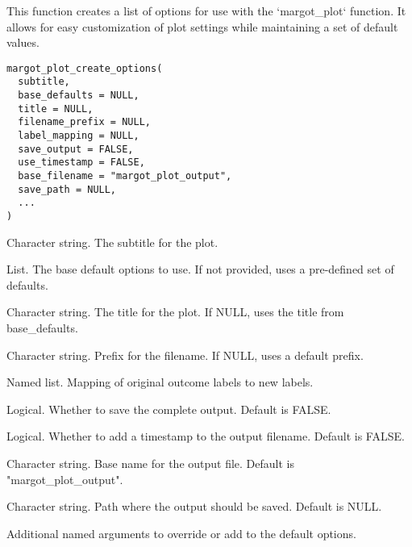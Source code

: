 \documentclass[a4paper]{book}
\begin{document}
%
\begin{Description}
This function creates a list of options for use with the `margot\_plot` function.
It allows for easy customization of plot settings while maintaining a set of default values.
\end{Description}
%
\begin{Usage}
\begin{verbatim}
margot_plot_create_options(
  subtitle,
  base_defaults = NULL,
  title = NULL,
  filename_prefix = NULL,
  label_mapping = NULL,
  save_output = FALSE,
  use_timestamp = FALSE,
  base_filename = "margot_plot_output",
  save_path = NULL,
  ...
)
\end{verbatim}
\end{Usage}
%
\begin{Arguments}
\begin{ldescription}
\item[\code{subtitle}] Character string. The subtitle for the plot.

\item[\code{base\_defaults}] List. The base default options to use. If not provided, uses a pre-defined set of defaults.

\item[\code{title}] Character string. The title for the plot. If NULL, uses the title from base\_defaults.

\item[\code{filename\_prefix}] Character string. Prefix for the filename. If NULL, uses a default prefix.

\item[\code{label\_mapping}] Named list. Mapping of original outcome labels to new labels.

\item[\code{save\_output}] Logical. Whether to save the complete output. Default is FALSE.

\item[\code{use\_timestamp}] Logical. Whether to add a timestamp to the output filename. Default is FALSE.

\item[\code{base\_filename}] Character string. Base name for the output file. Default is "margot\_plot\_output".

\item[\code{save\_path}] Character string. Path where the output should be saved. Default is NULL.

\item[\code{...}] Additional named arguments to override or add to the default options.
\end{ldescription}
\end{Arguments}
\end{document}
